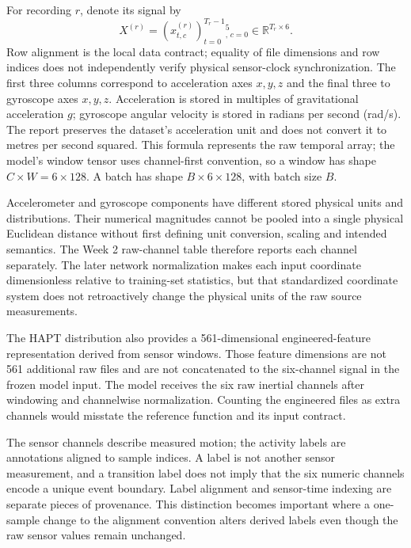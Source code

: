 \documentclass[11pt,a4paper]{article}
\newcommand{\R}{\mathbb R}\newcommand{\N}{\mathbb N}
\begin{document}
For recording $r$, denote its signal by
\[
 X^{(r)}=(x^{(r)}_{t,c})_{t=0}^{T_r-1}{}_{,\,c=0}^{5}\in\R^{T_r\times6}.
\]
Row alignment is the local data contract; equality of file dimensions and row indices does not independently verify physical sensor-clock synchronization. The first three columns correspond to acceleration axes $x,y,z$ and the final three to gyroscope axes $x,y,z$. Acceleration is stored in multiples of gravitational acceleration $g$; gyroscope angular velocity is stored in radians per second (rad/s). The report preserves the dataset's acceleration unit and does not convert it to metres per second squared. This formula represents the raw temporal array; the model's window tensor uses channel-first convention, so a window has shape $C\times W=6\times128$. A batch has shape $B\times6\times128$, with batch size $B$.

Accelerometer and gyroscope components have different stored physical units and distributions. Their numerical magnitudes cannot be pooled into a single physical Euclidean distance without first defining unit conversion, scaling and intended semantics. The Week 2 raw-channel table therefore reports each channel separately. The later network normalization makes each input coordinate dimensionless relative to training-set statistics, but that standardized coordinate system does not retroactively change the physical units of the raw source measurements.

The HAPT distribution also provides a 561-dimensional engineered-feature representation derived from sensor windows. Those feature dimensions are not 561 additional raw files and are not concatenated to the six-channel signal in the frozen model input. The model receives the six raw inertial channels after windowing and channelwise normalization. Counting the engineered files as extra channels would misstate the reference function and its input contract.

The sensor channels describe measured motion; the activity labels are annotations aligned to sample indices. A label is not another sensor measurement, and a transition label does not imply that the six numeric channels encode a unique event boundary. Label alignment and sensor-time indexing are separate pieces of provenance. This distinction becomes important where a one-sample change to the alignment convention alters derived labels even though the raw sensor values remain unchanged.
\end{document}
